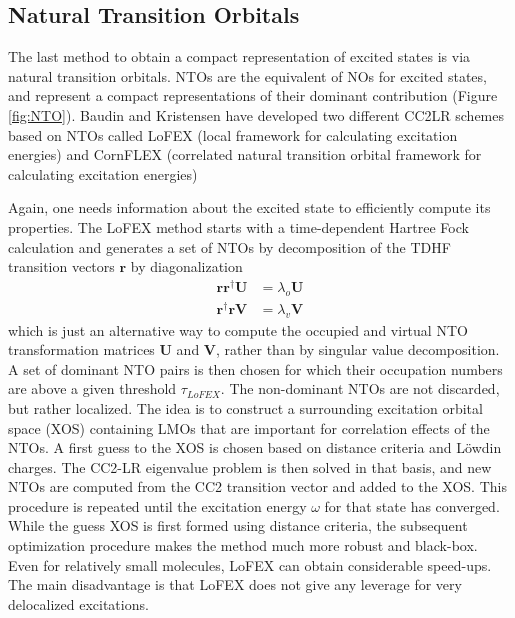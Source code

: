 
 
\subsection{Natural Transition Orbitals}

The last method to obtain a compact representation of excited states is via natural transition orbitals. NTOs are the equivalent of NOs for excited states, and represent a compact representations of their dominant contribution (Figure \ref{fig:NTO}). Baudin and Kristensen have developed two different CC2LR schemes based on NTOs called LoFEX (local framework for calculating excitation energies) \cite{Bau2016} and CornFLEX (correlated natural transition orbital framework for calculating excitation energies) \cite{Bau2017} 

Again, one needs information about the excited state to efficiently compute its properties. The LoFEX method starts with a time-dependent Hartree Fock calculation and generates a set of NTOs by decomposition of the TDHF transition vectors $\mathbf{r}$ by diagonalization
\begin{align}
\mathbf{r} \mathbf{r}^{\dagger} \mathbf{U} &= \lambda_o \mathbf{U} \\
\mathbf{r}^{\dagger} \mathbf{r} \mathbf{V} &= \lambda_v \mathbf{V}
\end{align}
\noindent which is just an alternative way to compute the occupied and virtual NTO transformation matrices $\mathbf{U}$ and $\mathbf{V}$, rather than by singular value decomposition. A set of dominant NTO pairs is then chosen for which their occupation numbers are above a given threshold $\tau_{LoFEX}$. The non-dominant NTOs are not discarded, but rather localized. The idea is to construct a surrounding excitation orbital space (XOS) containing LMOs that are important for correlation effects of the NTOs. A first guess to the XOS is chosen based on distance criteria and Löwdin charges. The CC2-LR eigenvalue problem is then solved in that basis, and new NTOs are computed from the CC2 transition vector and added to the XOS. This procedure is repeated until the excitation energy $\omega$ for that state has converged. While the guess XOS is first formed using distance criteria, the subsequent optimization procedure makes the method much more robust and black-box. Even for relatively small molecules, LoFEX can obtain considerable speed-ups. The main disadvantage is that LoFEX does not give any leverage for very delocalized excitations. 

